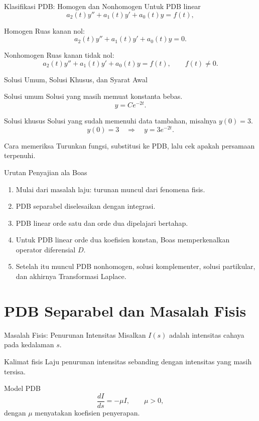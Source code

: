 \documentclass[aspectratio=169,11pt]{beamer}
\begin{document}
\begin{frame}{Klasifikasi PDB: Homogen dan Nonhomogen}
Untuk PDB linear
\[
a_2(t)y''+a_1(t)y'+a_0(t)y=f(t),
\]
\begin{block}{Homogen}
Ruas kanan nol:
\[
a_2(t)y''+a_1(t)y'+a_0(t)y=0.
\]
\end{block}
\begin{block}{Nonhomogen}
Ruas kanan tidak nol:
\[
a_2(t)y''+a_1(t)y'+a_0(t)y=f(t),\qquad f(t)\neq 0.
\]
\end{block}
\end{frame}

\begin{frame}{Solusi Umum, Solusi Khusus, dan Syarat Awal}
\begin{block}{Solusi umum}
Solusi yang masih memuat konstanta bebas.
\[
y=C e^{-2t}.
\]
\end{block}
\begin{block}{Solusi khusus}
Solusi yang sudah memenuhi data tambahan, misalnya $y(0)=3$.
\[
y(0)=3 \quad \Rightarrow \quad y=3e^{-2t}.
\]
\end{block}
\begin{alertblock}{Cara memeriksa}
Turunkan fungsi, substitusi ke PDB, lalu cek apakah persamaan terpenuhi.
\end{alertblock}
\end{frame}

\begin{frame}{Urutan Penyajian ala Boas}
\begin{enumerate}
  \item Mulai dari masalah laju: turunan muncul dari fenomena fisis.
  \item PDB separabel diselesaikan dengan integrasi.
  \item PDB linear orde satu dan orde dua dipelajari bertahap.
  \item Untuk PDB linear orde dua koefisien konstan, Boas memperkenalkan operator diferensial $D$.
  \item Setelah itu muncul PDB nonhomogen, solusi komplementer, solusi partikular, dan akhirnya Transformasi Laplace.
\end{enumerate}
\end{frame}

\section{PDB Separabel dan Masalah Fisis}

\begin{frame}{Masalah Fisis: Penurunan Intensitas}
Misalkan $I(s)$ adalah intensitas cahaya pada kedalaman $s$.
\begin{block}{Kalimat fisis}
Laju penurunan intensitas sebanding dengan intensitas yang masih tersisa.
\end{block}
\begin{block}{Model PDB}
\[
\frac{dI}{ds}=-\mu I,\qquad \mu>0,
\]
dengan $\mu$ menyatakan koefisien penyerapan.
\end{block}
\end{frame}
\end{document}
